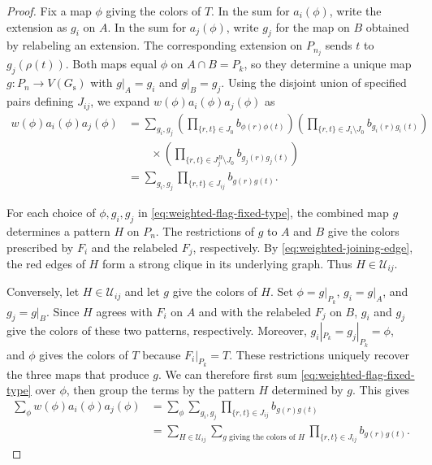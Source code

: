 \documentclass[preprint,11pt,numbers]{elsarticle-arxiv}
\numberwithin{equation}{section}
\theoremstyle{definition}
\begin{document}
\begin{proof}
Fix a map $\phi$ giving the colors of $T$. In the sum for $a_i(\phi)$,
write the extension as $g_i$ on $A$. In the sum for $a_j(\phi)$,
write $g_j$ for the map on $B$ obtained by relabeling an extension.
The corresponding extension on $P_{n_j}$ sends $t$ to
$g_j(\rho(t))$. Both maps equal $\phi$ on $A\cap B=P_k$, so they determine a
unique map $g\colon P_n\to V(G_{\mathrm s})$ with $g|_A=g_i$ and
$g|_B=g_j$. Using the disjoint union of specified pairs defining
$J_{ij}$, we expand $w(\phi)a_i(\phi)a_j(\phi)$ as
\begin{equation}\label{eq:weighted-flag-fixed-type}
\begin{aligned}
 w(\phi)a_i(\phi)a_j(\phi)
 &=\sum_{g_i,g_j}
   \left(\prod_{\{r,t\}\in J_0} b_{\phi(r)\phi(t)}\right)
   \left(\prod_{\{r,t\}\in J_i\setminus J_0} b_{g_i(r)g_i(t)}\right)\\
 &\qquad{}\times
   \left(\prod_{\{r,t\}\in J_j^B\setminus J_0} b_{g_j(r)g_j(t)}\right)\\
 &=\sum_{g_i,g_j}\prod_{\{r,t\}\in J_{ij}}b_{g(r)g(t)}.
\end{aligned}
\end{equation}

For each choice of $\phi,g_i,g_j$ in \eqref{eq:weighted-flag-fixed-type},
the combined map $g$ determines a pattern $H$ on $P_n$. The
restrictions of $g$ to $A$ and $B$ give the colors prescribed by $F_i$
and the relabeled $F_j$, respectively. By \eqref{eq:weighted-joining-edge},
the red edges of $H$ form a strong clique in its underlying graph.
Thus $H\in\mathcal U_{ij}$.

Conversely, let $H\in\mathcal U_{ij}$ and let $g$ give the colors of
$H$. Set $\phi=g|_{P_k}$, $g_i=g|_A$, and $g_j=g|_B$. Since $H$
agrees with $F_i$ on $A$ and with the relabeled $F_j$ on $B$, $g_i$
and $g_j$ give the colors of these two patterns, respectively.
Moreover, $g_i|_{P_k}=g_j|_{P_k}=\phi$, and $\phi$ gives the colors
of $T$ because $F_i|_{P_k}=T$. These restrictions uniquely recover
the three maps that produce $g$. We can therefore first sum
\eqref{eq:weighted-flag-fixed-type} over $\phi$, then group the terms
by the pattern $H$ determined by $g$. This gives
\begin{equation}\label{eq:weighted-flag-grouping}
\begin{aligned}
 \sum_\phi w(\phi)a_i(\phi)a_j(\phi)
 &=\sum_\phi\sum_{g_i,g_j}
      \prod_{\{r,t\}\in J_{ij}}b_{g(r)g(t)}\\
 &=\sum_{H\in\mathcal U_{ij}}
    \sum_{g\text{ giving the colors of }H}
      \prod_{\{r,t\}\in J_{ij}}b_{g(r)g(t)}.
\end{aligned}
\end{equation}


\end{proof}
\end{document}
